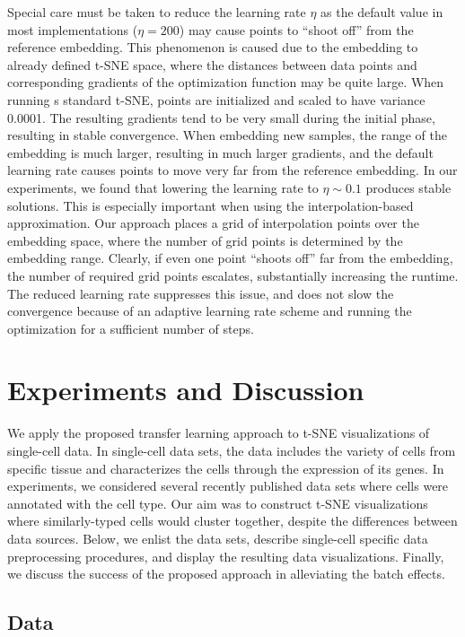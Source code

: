 \documentclass[runningheads]{llncs}
\begin{document}
Special care must be taken to reduce the learning rate $\eta$ as the default
value in most implementations ($\eta = 200$) may cause points to ``shoot off''
from the reference embedding. This phenomenon is caused due to the embedding to
already defined t-SNE space, where the distances between data points and
corresponding gradients of the optimization function may be quite large. When
running s standard t-SNE, points are initialized and scaled to have variance
0.0001. The resulting gradients tend to be very small during the initial phase,
resulting in stable convergence. When embedding new samples, the range of the
embedding is much larger, resulting in much larger gradients, and the default
learning rate causes points to move very far from the reference embedding. In
our experiments, we found that lowering the learning rate to $\eta \sim 0.1$
produces stable solutions. This is especially important when using the
interpolation-based approximation. Our approach places a grid of interpolation
points over the embedding space, where the number of grid points is determined
by the embedding range. Clearly, if even one point ``shoots off'' far from the
embedding, the number of required grid points escalates, substantially
increasing the runtime. The reduced learning rate suppresses this issue, and
does not slow the convergence because of an adaptive learning rate scheme and
running the optimization for a sufficient number of steps. 

\section{Experiments and Discussion}

We apply the proposed transfer learning approach to t-SNE visualizations of
single-cell data. In single-cell data sets, the data includes the variety of
cells from specific tissue and characterizes the cells through the expression
of its genes. In experiments, we considered several recently published data
sets where cells were annotated with the cell type. Our aim was to construct
t-SNE visualizations where similarly-typed cells would cluster together,
despite the differences between data sources. Below, we enlist the data sets,
describe single-cell specific data preprocessing procedures, and display the
resulting data visualizations. Finally, we discuss the success of the proposed
approach in alleviating the batch effects.


\subsection{Data}
\end{document}
